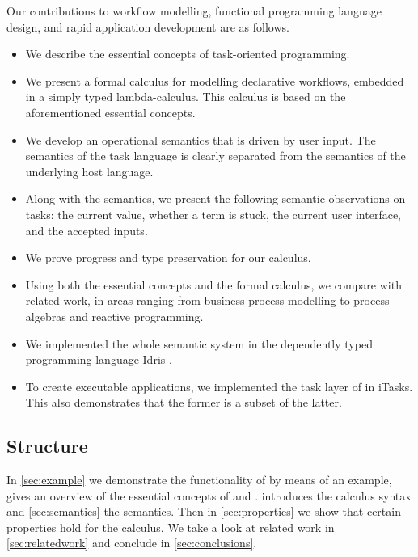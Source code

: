 Our contributions to workflow modelling, functional programming language design, and rapid application development are as follows.


\begin{itemize}
  \item
    We describe the essential concepts of task-oriented programming.

  \item
    We present a formal calculus for modelling declarative workflows, embedded in a simply typed lambda-calculus.
    This calculus is based on the aforementioned essential \TOP concepts.

  \item
    We develop an operational semantics that is driven by user input.
    The semantics of the task language is clearly separated from the semantics of the underlying host language.

  \item
    Along with the semantics, we present the following semantic observations on tasks:
    the current value, whether a term is stuck, the current user interface, and the accepted inputs.

  \item
    We prove progress and type preservation for our calculus.

  \item
    Using both the essential concepts and the formal calculus, we compare \TOP with related work, in areas ranging from business process modelling to process algebras and reactive programming.

  \item
    We implemented the whole semantic system in the dependently typed programming language Idris \cite{journals/jfp/Brady13}.

  \item

    To create executable applications, we implemented the task layer of \TOPHAT in iTasks.
    This also demonstrates that the former is a subset of the latter.


\end{itemize}


\subsection{Structure}

In \cref{sec:example} we demonstrate the functionality of \TOPHAT by means of an example,
 gives an overview of the essential concepts of \TOP and \TOPHAT.
 introduces the \TOPHAT calculus syntax
and \cref{sec:semantics} the semantics.
Then in \cref{sec:properties} we show that certain properties hold for the calculus.
We take a look at related work in \cref{sec:relatedwork}
and conclude in \cref{sec:conclusions}.
